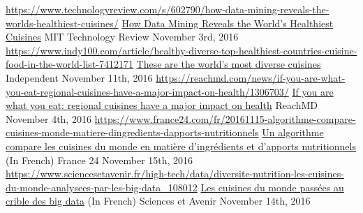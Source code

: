 
\begin{cventries}
  \cventrypress
    {\url{https://www.technologyreview.com/s/602790/how-data-mining-reveals-the-worlds-healthiest-cuisines/}}
    {\href{https://www.technologyreview.com/s/602790/how-data-mining-reveals-the-worlds-healthiest-cuisines/}{How Data Mining Reveals the World’s Healthiest Cuisines}}
    {MIT Technology Review}
    {November 3rd, 2016}
  \cventrypress
    {\url{https://www.indy100.com/article/healthy-diverse-top-healthiest-countries-cuisine-food-in-the-world-list-7412171}}
    {\href{https://www.indy100.com/article/healthy-diverse-top-healthiest-countries-cuisine-food-in-the-world-list-7412171}{These are the world's most diverse cuisines}}
    {Independent}
    {November 11th, 2016}
  \cventrypress
    {\url{https://reachmd.com/news/if-you-are-what-you-eat-regional-cuisines-have-a-major-impact-on-health/1306703/}}
    {\href{https://reachmd.com/news/if-you-are-what-you-eat-regional-cuisines-have-a-major-impact-on-health/1306703/}{If you are what you eat: regional cuisines have a major impact on health}}
    {ReachMD}
    {November 4th, 2016}
  \cventrypress
    {\url{https://www.france24.com/fr/20161115-algorithme-compare-cuisines-monde-matiere-dingredients-dapports-nutritionnels}}
    {\href{https://www.france24.com/fr/20161115-algorithme-compare-cuisines-monde-matiere-dingredients-dapports-nutritionnels}{Un algorithme compare les cuisines du monde en matière d'ingrédients et d'apports nutritionnels} (In French)}
    {France 24}
    {November 15th, 2016}
  \cventrypress
    {\url{https://www.sciencesetavenir.fr/high-tech/data/diversite-nutrition-les-cuisines-du-monde-analysees-par-les-big-data_108012}}
    {\href{https://www.sciencesetavenir.fr/high-tech/data/diversite-nutrition-les-cuisines-du-monde-analysees-par-les-big-data_108012}{Les cuisines du monde passées au crible des big data} (In French)}
    {Sciences et Avenir}
    {November 14th, 2016}

    
\end{cventries}
